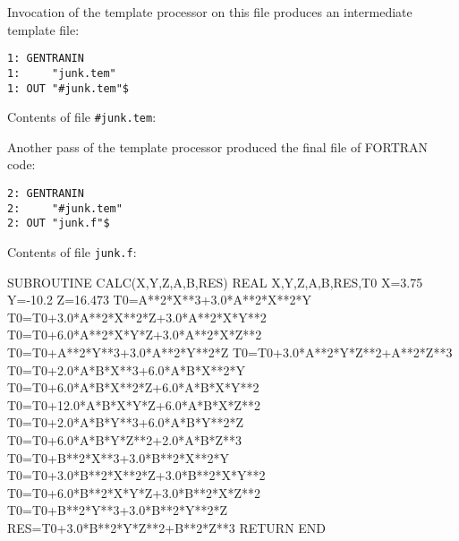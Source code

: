 Invocation of the template processor on this file produces an
intermediate template file:
\begin{verbatim}
1: GENTRANIN
1:     "junk.tem"
1: OUT "#junk.tem"$
\end{verbatim}
Contents of file {\tt \#junk.tem}:
Another pass of the template processor produced the final file of FORTRAN
code:
\begin{verbatim}
2: GENTRANIN
2:     "#junk.tem"
2: OUT "junk.f"$
\end{verbatim}
Contents of file {\tt junk.f}:
\begin{framedverbatim}
      SUBROUTINE CALC(X,Y,Z,A,B,RES)
      REAL X,Y,Z,A,B,RES,T0
      X=3.75
      Y=-10.2
      Z=16.473
      T0=A**2*X**3+3.0*A**2*X**2*Y
      T0=T0+3.0*A**2*X**2*Z+3.0*A**2*X*Y**2
      T0=T0+6.0*A**2*X*Y*Z+3.0*A**2*X*Z**2
      T0=T0+A**2*Y**3+3.0*A**2*Y**2*Z
      T0=T0+3.0*A**2*Y*Z**2+A**2*Z**3
      T0=T0+2.0*A*B*X**3+6.0*A*B*X**2*Y
      T0=T0+6.0*A*B*X**2*Z+6.0*A*B*X*Y**2
      T0=T0+12.0*A*B*X*Y*Z+6.0*A*B*X*Z**2
      T0=T0+2.0*A*B*Y**3+6.0*A*B*Y**2*Z
      T0=T0+6.0*A*B*Y*Z**2+2.0*A*B*Z**3
      T0=T0+B**2*X**3+3.0*B**2*X**2*Y
      T0=T0+3.0*B**2*X**2*Z+3.0*B**2*X*Y**2
      T0=T0+6.0*B**2*X*Y*Z+3.0*B**2*X*Z**2
      T0=T0+B**2*Y**3+3.0*B**2*Y**2*Z
      RES=T0+3.0*B**2*Y*Z**2+B**2*Z**3
      RETURN
      END
\end{framedverbatim}

